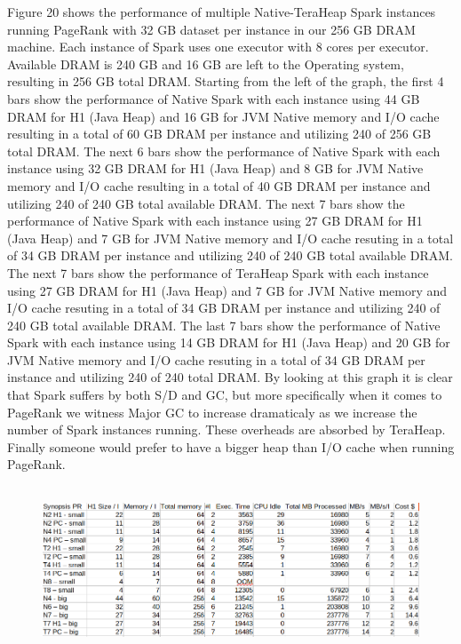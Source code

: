 \documentclass[twocolumn,10pt]{asme2e}
\begin{document}
Figure 20 shows the performance of multiple Native-TeraHeap Spark instances running PageRank with 32 GB dataset per instance in our 256 GB DRAM machine. Each instance of Spark uses one executor with 8 cores per executor. Available DRAM is 240 GB and 16 GB are left to the Operating system, resulting in 256 GB total DRAM. Starting from the left of the graph, the first 4 bars show the performance of Native Spark with each instance using 44 GB DRAM for H1 (Java Heap) and 16 GB for JVM Native memory and I/O cache resulting in a total of 60 GB DRAM per instance and utilizing 240 of 256 GB total DRAM. The next 6 bars show the performance of Native Spark with each instance using 32 GB DRAM for H1 (Java Heap) and 8 GB for JVM Native memory and I/O cache resulting in a total of 40 GB DRAM per instance and utilizing 240 of 240 GB total available DRAM. The next 7 bars show the performance of Native Spark with each instance using 27 GB DRAM for H1 (Java Heap) and 7 GB for JVM Native memory and I/O cache resuting in a total of 34 GB DRAM per instance and utilizing 240 of 240 GB total available DRAM. The next 7 bars show the performance of TeraHeap Spark with each instance using 27 GB DRAM for H1 (Java Heap) and 7 GB for JVM Native memory and I/O cache resuting in a total of 34 GB DRAM per instance and utilizing 240 of 240 GB total available DRAM. The last 7 bars show the performance of Native Spark with each instance using 14 GB DRAM for H1 (Java Heap) and 20 GB for JVM Native memory and I/O cache resuting in a total of 34 GB DRAM per instance and utilizing 240 of 240 total DRAM. By looking at this graph it is clear that Spark suffers by both S/D and GC, but more specifically when it comes to PageRank we witness Major GC to increase dramaticaly as we increase the number of Spark instances running. These overheads are absorbed by TeraHeap.
Finally someone would prefer to have a bigger heap than I/O cache when running PageRank.

\begin{figure}[h!]
        \includegraphics[width=18cm,height=5cm]{pr_table.png}
\end{figure}
\end{document}
